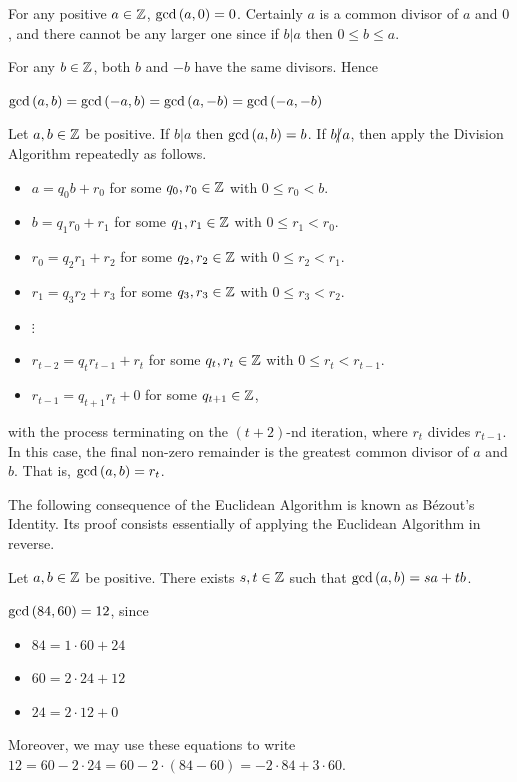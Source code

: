 \documentclass[11pt,fleqn,dvipsnames,usenames]{article}
\newcommand{\p}{\noindent}
\begin{document}
\begin{example}
For any positive $a\in\mathbb{Z}$, $\text{gcd}\left(a,0\right) = 0$.  Certainly $a$ is a common divisor of $a$ and $0$, and there cannot be any larger one since if $b|a$ then $0\leq b\leq a$.
\end{example}

\note For any $b\in\mathbb{Z}$, both $b$ and $-b$ have the same divisors.  Hence
\begin{center}
$\text{gcd}\left(a,b\right) = \text{gcd}\left(-a,b\right) = \text{gcd}\left(a,-b\right) = \text{gcd}\left(-a,-b\right)$
\end{center}
\newpage

\begin{theorem}\label{euclideanalg}
Let $a,b\in\mathbb{Z}$ be positive.  If $b|a$ then $\text{gcd}\left(a,b\right) = b$.  If $b|\kern-0.9ex{/} a$, then apply the Division Algorithm repeatedly as follows.

\begin{itemize}[\ ]
\item $a = q_{0}b + r_{0}$ for some $q_{0},r_{0}\in\mathbb{Z}$ with $0 \leq r_{0} < b$.
\item $b = q_{1}r_{0} + r_{1}$ for some $q_{1},r_{1}\in\mathbb{Z}$ with $0 \leq r_{1} < r_{0}$.
\item $r_{0} = q_{2}r_{1} + r_{2}$ for some $q_{2},r_{2}\in\mathbb{Z}$ with $0 \leq r_{2} < r_{1}$.
\item $r_{1} = q_{3}r_{2} + r_{3}$ for some $q_{3},r_{3}\in\mathbb{Z}$ with $0 \leq r_{3} < r_{2}$.
\item {}$\vdots$
\item $r_{t-2} = q_{t}r_{t-1} + r_{t}$ for some $q_{t},r_{t}\in\mathbb{Z}$ with $0 \leq r_{t} < r_{t-1}$.
\item $r_{t-1} = q_{t+1}r_{t} + 0$ for some $q_{t+1}\in\mathbb{Z}$,
\end{itemize}
with the process terminating on the $(t+2)$-nd iteration, where $r_{t}$ divides $r_{t-1}$.  In this case, the final non-zero remainder is the greatest common divisor of $a$ and $b$.  That is, $\text{gcd}\left(a,b\right) = r_{t}$.
\end{theorem}
\vsp

\p The following consequence of the Euclidean Algorithm is known as B\'{e}zout's Identity.  Its proof consists  essentially of applying the Euclidean Algorithm in reverse.
\vsp

\begin{corollary}\label{bezout}
Let $a,b\in\mathbb{Z}$ be positive.  There exists $s,t\in\mathbb{Z}$ such that $\text{gcd}\left(a,b\right) = sa + tb$.
\end{corollary}
%
\begin{example}
$\text{gcd}\left(84,60\right) = 12$, since
\begin{itemize}[\ ]
\item $84 = 1\cdot 60 + 24$
\item $60 = 2\cdot 24 + 12$
\item $24 = 2\cdot 12 + 0$
\end{itemize}

\p Moreover, we may use these equations to write $12 = 60 - 2\cdot 24 = 60 - 2\cdot (84 - 60) = -2\cdot 84 + 3\cdot 60$.
\end{example}
\end{document}
